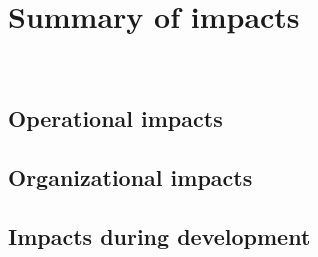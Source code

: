 \chapter{Summary of impacts \\
\label{Chapter::Summary of impacts}}\


\section{Operational impacts\label{Section::Operational Impacts}}


\section{Organizational impacts \label{Section::Organizational Impacts}}




\section{Impacts during development\label{Section::Impacts During Development}} 





